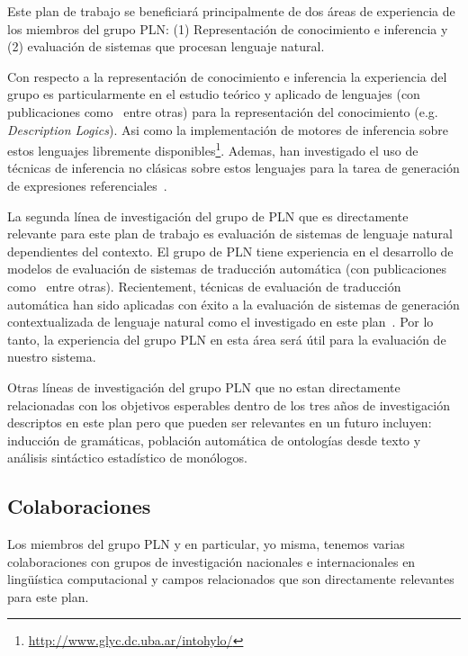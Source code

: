 \documentclass[11pt]{article}
\begin{document}
Este plan de trabajo se beneficiar\'a principalmente de dos \'areas de
experiencia de los miembros del grupo PLN: (1) Representaci\'on de conocimiento
e inferencia y (2) evaluaci\'on de sistemas que procesan lenguaje natural. 

Con respecto a la representaci\'on de conocimiento e inferencia la experiencia
del grupo es particularmente en el estudio te\'orico y aplicado de lenguajes
(con publicaciones como~\citep{arec:logi00,arec:reso01,arec:reso10} entre otras)
para la representaci\'on del conocimiento (e.g. \emph{Description Logics}). Asi
como la implementaci\'on de motores de inferencia sobre estos lenguajes
libremente disponibles\footnote{\url{http://www.glyc.dc.uba.ar/intohylo/}}.
Ademas, han investigado el uso de t\'ecnicas de inferencia no cl\'asicas sobre
estos lenguajes para la tarea de generaci\'on de expresiones
referenciales~\citep{AKS08}.

La segunda l\'inea de investigaci\'on del grupo de PLN que es directamente
relevante para este plan de trabajo es evaluaci\'on de sistemas de lenguaje
natural dependientes del contexto. El grupo de PLN tiene experiencia en el
desarrollo de modelos de evaluaci\'on de sistemas de traducci\'on
autom\'atica (con publicaciones como~\citep{estrella08,estrella10} entre
otras). Recientement, t\'ecnicas de evaluaci\'on de traducci\'on autom\'atica
han sido aplicadas con \'exito a la evaluaci\'on de sistemas de generaci\'on
contextualizada de lenguaje natural como el investigado en este
plan~\citep{reiter09}. Por lo tanto, la experiencia del grupo PLN en esta
\'area ser\'a \'util para la evaluaci\'on de nuestro sistema. 

Otras l\'ineas de investigaci\'on del grupo PLN que no estan directamente
relacionadas con los objetivos esperables dentro de los tres a\~nos de
investigaci\'on descriptos en este plan pero que pueden ser relevantes en un
futuro incluyen: inducci\'on de gram\'aticas, poblaci\'on autom\'atica de
ontolog\'ias desde texto y an\'alisis sint\'actico estad\'istico de
mon\'ologos.  
          


\subsection{Colaboraciones} \label{colaboraciones}

Los miembros del grupo PLN y en particular, yo misma, tenemos varias
colaboraciones con grupos de investigaci\'on nacionales e internacionales en
ling\"u\'istica computacional y campos relacionados que son directamente
relevantes para este plan. 
\end{document}
